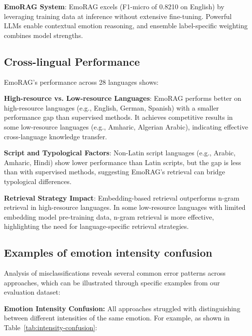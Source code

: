 \documentclass[a4paper,12pt]{extarticle}
\begin{document}
\textbf{EmoRAG System}: EmoRAG excels (F1-micro of 0.8210 on English) by leveraging training data at inference without extensive fine-tuning. Powerful LLMs enable contextual emotion reasoning, and ensemble label-specific weighting combines model strengths.

\subsection{Cross-lingual Performance}

EmoRAG's performance across 28 languages shows:

\textbf{High-resource vs. Low-resource Languages}: EmoRAG performs better on high-resource languages (e.g., English, German, Spanish) with a smaller performance gap than supervised methods. It achieves competitive results in some low-resource languages (e.g., Amharic, Algerian Arabic), indicating effective cross-language knowledge transfer.

\textbf{Script and Typological Factors}: Non-Latin script languages (e.g., Arabic, Amharic, Hindi) show lower performance than Latin scripts, but the gap is less than with supervised methods, suggesting EmoRAG's retrieval can bridge typological differences.

\textbf{Retrieval Strategy Impact}: Embedding-based retrieval outperforms n-gram retrieval in high-resource languages. In some low-resource languages with limited embedding model pre-training data, n-gram retrieval is more effective, highlighting the need for language-specific retrieval strategies.

\subsection{Examples of emotion intensity confusion}

Analysis of misclassifications reveals several common error patterns across approaches, which can be illustrated through specific examples from our evaluation dataset:

\textbf{Emotion Intensity Confusion:} All approaches struggled with distinguishing between different intensities of the same emotion. For example, as shown in Table~\ref{tab:intensity-confusion}:
\end{document}
